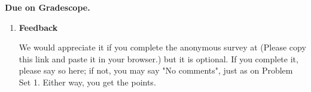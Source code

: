 \documentclass{article}
\begin{document}
\pagestyle{myheadings} 

\ifnum{}  \fi

{\bf Due {\due } on Gradescope.}

\medskip


\begin{enumerate}[wide, labelwidth=!, labelindent=0pt]

    \clearpage
    
    
    \clearpage
    
    
    \clearpage
    
    
    \clearpage
    
    
    \clearpage
    
    
    \clearpage
    \item {} {\bf Feedback}
    
    We would appreciate it if you complete the anonymous survey at \survey (Please copy this link and paste it in your browser.) but it is optional.
    If you complete it, please say so here; if not, you may say "No comments", just as on Problem Set 1. Either way, you get the points.
    
    \begin{answer}
    
    \end{answer}
    
\end{enumerate}
\end{document}

